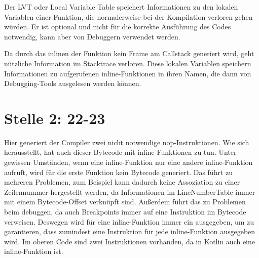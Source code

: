 Der LVT oder Local Variable Table speichert Informationen zu den lokalen Variablen einer Funktion, die normalerweise
bei der Kompilation verloren gehen würden.
Er ist optional und nicht für die korrekte Ausführung des Codes notwendig, kann aber von
Debuggern verwendet werden.

Da durch das inlinen der Funktion kein Frame am Callstack generiert wird, geht nützliche Information im Stacktrace
verloren.
Diese lokalen Variablen speichern Informationen zu aufgerufenen inline-Funktionen in ihren Namen, die dann von
Debugging-Tools ausgelesen werden können.

\section{Stelle 2: 22-23}

Hier generiert der Compiler zwei nicht notwendige nop-Instruktionen.
Wie sich herausstellt, hat auch dieser Bytecode mit inline-Funktionen zu tun.
Unter gewissen Umständen, \zB wenn eine inline-Funktion nur eine andere inline-Funktion aufruft,
wird für die erste Funktion kein Bytecode generiert.
Das führt zu mehreren Problemen, zum Beispiel kann dadurch keine Assoziation zu einer Zeilennummer hergestellt werden,
da Informationen im LineNumberTable immer mit einem Bytecode-Offset verknüpft sind.
Außerdem führt das zu Problemen beim debuggen, da auch Breakpoints immer auf eine Instruktion im Bytecode verweisen.
Deswegen wird für eine inline-Funktion immer ein  ausgegeben, um zu garantieren, dass
zumindest eine Instruktion für jede inline-Funktion ausgegeben wird.
Im oberen Code sind zwei  Instruktionen vorhanden, da in Kotlin  auch eine
inline-Funktion ist.

\renewcommand{\kapitelautor}{}
